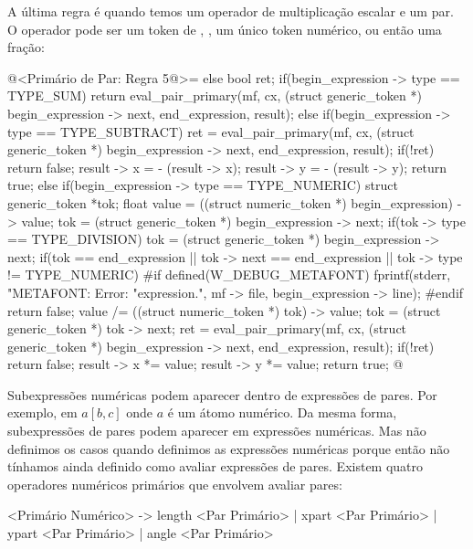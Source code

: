 A última regra é quando temos um operador de multiplicação escalar e
um par. O operador pode ser um token
de \monoespaco{+}, \monoespaco{-}, um único token numérico, ou então
uma fração:


\iniciocodigo
@<Primário de Par: Regra 5@>=
else{
  bool ret;
  if(begin_expression -> type == TYPE_SUM)
    return eval_pair_primary(mf, cx, (struct generic_token *)
                                     begin_expression -> next,
                             end_expression, result);
  else if(begin_expression -> type == TYPE_SUBTRACT){
    ret = eval_pair_primary(mf, cx, (struct generic_token *)
                                     begin_expression -> next,
                             end_expression, result);
    if(!ret)
      return false;
    result -> x = - (result -> x);
    result -> y = - (result -> y);
    return true;
  }
  else if(begin_expression -> type == TYPE_NUMERIC){
    struct generic_token *tok;
    float value = ((struct numeric_token *) begin_expression) -> value;
    tok = (struct generic_token *) begin_expression -> next;
    if(tok -> type == TYPE_DIVISION){
      tok = (struct generic_token *) begin_expression -> next;
      if(tok == end_expression || tok -> next == end_expression ||
         tok -> type != TYPE_NUMERIC){
#if defined(W_DEBUG_METAFONT)
        fprintf(stderr, "METAFONT: Error: %
                "expression.\n ", mf -> file, begin_expression -> line);
#endif
        return false;
      }
      value /= ((struct numeric_token *) tok) -> value;
      tok = (struct generic_token *) tok -> next;
    }
    ret = eval_pair_primary(mf, cx, (struct generic_token *)
                                     begin_expression -> next,
                             end_expression, result);
    if(!ret)
      return false;
    result -> x *= value;
    result -> y *= value;
    return true;
  }
}
@
\fimcodigo


Subexpressões numéricas podem aparecer dentro de expressões de
pares. Por exemplo, em $a[b,c]$ onde $a$ é um átomo numérico. Da mesma
forma, subexpressões de pares podem aparecer em expressões
numéricas. Mas não definimos os casos quando definimos as expressões
numéricas porque então não tínhamos ainda definido como avaliar
expressões de pares. Existem quatro operadores numéricos primários que
envolvem avaliar pares:

\alinhaverbatim
<Primário Numérico> -> length <Par Primário> | xpart <Par Primário> |
                       ypart <Par Primário> | angle <Par Primário>
\alinhanormal


